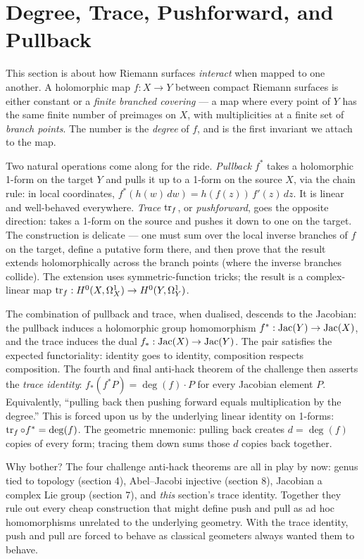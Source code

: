 \section{Degree, Trace, Pushforward, and Pullback}
\label{sec:degree-trace}

\begin{layman}
This section is about how Riemann surfaces \emph{interact} when
mapped to one another. A holomorphic map \(f : X \to Y\) between
compact Riemann surfaces is either constant or a \emph{finite
branched covering} --- a map where every point of \(Y\) has the same
finite number of preimages on \(X\), with multiplicities at a
finite set of \emph{branch points}. The number is the
\emph{degree} of \(f\), and is the first invariant we attach to
the map.

Two natural operations come along for the ride. \emph{Pullback}
\(f^*\) takes a holomorphic 1-form on the target \(Y\) and pulls
it up to a 1-form on the source \(X\), via the chain rule: in
local coordinates, \(f^*(h(w)\,dw) = h(f(z))\,f'(z)\,dz\). It is
linear and well-behaved everywhere. \emph{Trace} \(\operatorname{tr}_f\), or
\emph{pushforward}, goes the opposite direction: takes a 1-form
on the source and pushes it down to one on the target. The
construction is delicate --- one must sum over the local inverse
branches of \(f\) on the target, define a putative form there,
and then prove that the result extends holomorphically across
the branch points (where the inverse branches collide). The
extension uses symmetric-function tricks; the result is a
complex-linear map \(\operatorname{tr}_f : H^0(X, \Omega^1_X) \to
H^0(Y, \Omega^1_Y)\).

The combination of pullback and trace, when dualised, descends to
the Jacobian: the pullback induces a holomorphic group
homomorphism \(f^* : \operatorname{Jac}(Y) \to \operatorname{Jac}(X)\), and the trace induces
the dual \(f_* : \operatorname{Jac}(X) \to \operatorname{Jac}(Y)\). The pair satisfies the
expected functoriality: identity goes to identity, composition
respects composition. The fourth and final anti-hack theorem of
the challenge then asserts the \emph{trace identity}:
\(f_*(f^* P) = \deg(f) \cdot P\)
for every Jacobian element \(P\). Equivalently, ``pulling back
then pushing forward equals multiplication by the degree.'' This
is forced upon us by the underlying linear identity on 1-forms:
\(\operatorname{tr}_f \circ f^* = \deg(f)\).
The geometric mnemonic: pulling back creates \(d = \deg(f)\)
copies of every form; tracing them down sums those \(d\) copies
back together.

Why bother? The four challenge anti-hack theorems are all in
play by now: genus tied to topology (section 4), Abel--Jacobi
injective (section 8), Jacobian a complex Lie group (section 7),
and \emph{this} section's trace identity. Together they rule out
every cheap construction that might define push and pull as ad
hoc homomorphisms unrelated to the underlying geometry. With the
trace identity, push and pull are forced to behave as classical
geometers always wanted them to behave.
\end{layman}

